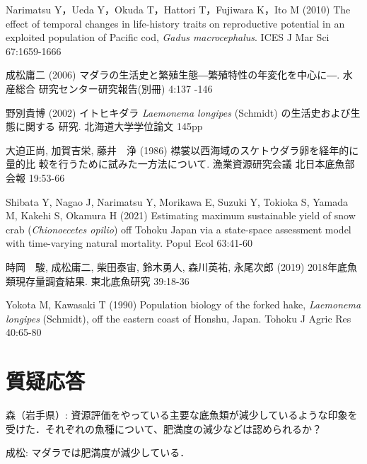 \documentclass[11pt]{article} %
\begin{document}
\begin{linenumbers}
\hangindent=30pt
\noindent
Narimatsu Y，Ueda Y，Okuda T，Hattori T，Fujiwara K，Ito M (2010) The effect of temporal changes in life-history traits on reproductive potential in an exploited population of Pacific cod, \textit{Gadus macrocephalus}. ICES J Mar Sci 67:1659-1666

\hangindent=30pt
\noindent
成松庸二 (2006) マダラの生活史と繁殖生態―繁殖特性の年変化を中心に―. 水産総合
研究センター研究報告(別冊) 4:137 -146

\hangindent=30pt
\noindent
野別貴博 (2002) イトヒキダラ \textit{Laemonema longipes} (Schmidt) の生活史および生態に関する
研究. 北海道大学学位論文 145pp

\hangindent=30pt
\noindent
大迫正尚, 加賀吉栄, 藤井　浄 (1986) 襟裳以西海域のスケトウダラ卵を経年的に量的比
較を行うために試みた一方法について. 漁業資源研究会議 北日本底魚部会報 19:53-66


\hangindent=30pt
\noindent
Shibata Y, Nagao J, Narimatsu Y, Morikawa E, Suzuki Y, Tokioka S, Yamada M, Kakehi S, 
Okamura H (2021) Estimating maximum sustainable yield of snow crab (\textit{Chionoecetes opilio}) off Tohoku Japan via a state-space assessment model with time-varying natural mortality. Popul Ecol 63:41-60

\hangindent=30pt
\noindent
時岡　駿, 成松庸二, 柴田泰宙, 鈴木勇人, 森川英祐, 永尾次郎 (2019) 2018年底魚類現存量調査結果. 東北底魚研究 39:18-36

\hangindent=30pt
\noindent
Yokota M, Kawasaki T (1990) Population biology of the forked hake, \textit{Laemonema longipes} 
 (Schmidt), off the eastern coast of Honshu, Japan. Tohoku J Agric Res 40:65-80 
 
 
\section{質疑応答}
森（岩手県）: 資源評価をやっている主要な底魚類が減少しているような印象を受けた．それぞれの魚種について、肥満度の減少などは認められるか？

成松: マダラでは肥満度が減少している．


\end{linenumbers}
\end{document}
